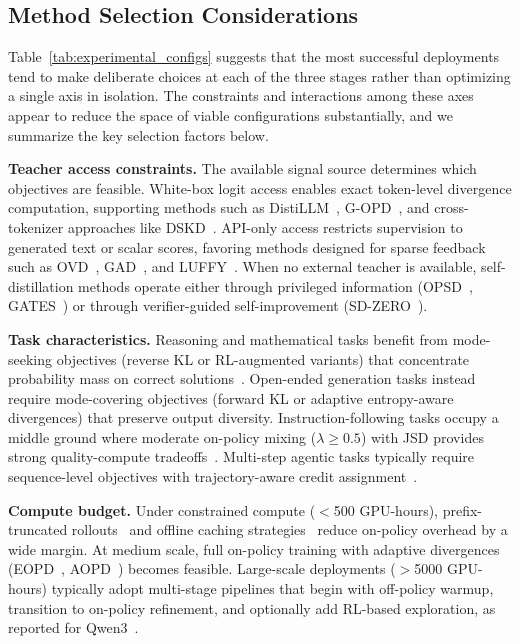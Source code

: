 \documentclass{article} %
\begin{document}
\subsection{Method Selection Considerations}
\label{subsec:decision_tree}

Table~\ref{tab:experimental_configs} suggests that the most successful deployments tend to make deliberate choices at each of the three stages rather than optimizing a single axis in isolation. The constraints and interactions among these axes appear to reduce the space of viable configurations substantially, and we summarize the key selection factors below.

\textbf{Teacher access constraints.} The available signal source determines which objectives are feasible. White-box logit access enables exact token-level divergence computation, supporting methods such as DistiLLM~\citep{2402.03898}, G-OPD~\citep{2602.12125}, and cross-tokenizer approaches like DSKD~\citep{2504.11426}. API-only access restricts supervision to generated text or scalar scores, favoring methods designed for sparse feedback such as OVD~\citep{2601.21968}, GAD~\citep{2511.10643}, and LUFFY~\citep{2504.14945}. When no external teacher is available, self-distillation methods operate either through privileged information (OPSD~\citep{2601.18734}, GATES~\citep{2602.20574}) or through verifier-guided self-improvement (SD-ZERO~\citep{2604.12002}).

\textbf{Task characteristics.} Reasoning and mathematical tasks benefit from mode-seeking objectives (reverse KL or RL-augmented variants) that concentrate probability mass on correct solutions~\citep{2306.08543,2602.12125,2506.02208}. Open-ended generation tasks instead require mode-covering objectives (forward KL or adaptive entropy-aware divergences) that preserve output diversity. Instruction-following tasks occupy a middle ground where moderate on-policy mixing ($\lambda \geq 0.5$) with JSD provides strong quality-compute tradeoffs~\citep{2306.13649}. Multi-step agentic tasks typically require sequence-level objectives with trajectory-aware credit assignment~\citep{2602.22495}.

\textbf{Compute budget.} Under constrained compute ($<$500 GPU-hours), prefix-truncated rollouts~\citep{2602.15260} and offline caching strategies~\citep{2604.13010} reduce on-policy overhead by a wide margin. At medium scale, full on-policy training with adaptive divergences (EOPD~\citep{2603.07079}, AOPD~\citep{2605.06387}) becomes feasible. Large-scale deployments ($>$5000 GPU-hours) typically adopt multi-stage pipelines that begin with off-policy warmup, transition to on-policy refinement, and optionally add RL-based exploration, as reported for Qwen3~\citep{2505.09388}.
\end{document}
